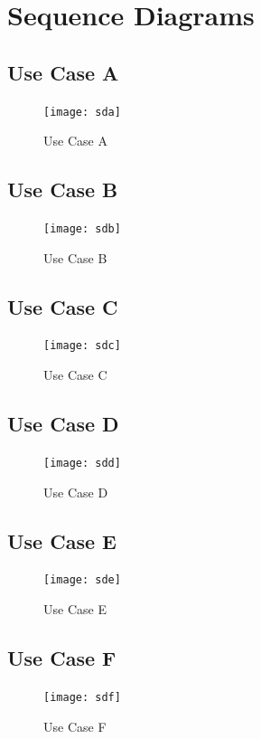\documentclass[]{article}
\begin{document}
\section{Sequence Diagrams}
\label{sec:sequence_diagrams}

\subsection{Use Case A}
\label{sub:overview}
\begin{figure}[H]
    \centering
    \texttt{[image: sda]}
    \caption{Use Case A}
    \label{fig:sda}
\end{figure}

\subsection{Use Case B}
\label{sub:overview}
\begin{figure}[H]
    \centering
    \texttt{[image: sdb]}
    \caption{Use Case B}
    \label{fig:sdb}
\end{figure}

\subsection{Use Case C}
\label{sub:overview}
\begin{figure}[H]
    \centering
    \texttt{[image: sdc]}
    \caption{Use Case C}
    \label{fig:sdc}
\end{figure}

\subsection{Use Case D}
\label{sub:overview}
\begin{figure}[H]
    \centering
    \texttt{[image: sdd]}
    \caption{Use Case D}
    \label{fig:sdd}
\end{figure}

\subsection{Use Case E}
\label{sub:overview}
\begin{figure}[H]
    \centering
    \texttt{[image: sde]}
    \caption{Use Case E}
    \label{fig:sde}
\end{figure}

\subsection{Use Case F}
\label{sub:overview}
\begin{figure}[H]
    \centering
    \texttt{[image: sdf]}
    \caption{Use Case F}
    \label{fig:sdf}
\end{figure}
\end{document}
